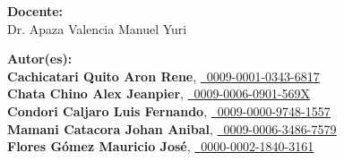 \documentclass[12pt,a4paper]{report}
\begin{document}
\begin{titlepage}
    \vspace{0.5cm}

    \begin{center}
        {\bfseries Docente:}\\[0.1cm]
        Dr. Apaza Valencia Manuel Yuri
    \end{center}

    \vspace{0.5cm}

    \begin{flushleft}
        {\bfseries Autor(es):}\\[0.2cm]
        \small 
        \textbf{Cachicatari Quito Aron Rene}, \href{https://orcid.org/0009-0001-0343-6817}{\textcolor{orcidlogocol}{\faOrcid \ 
        \underline{0009-0001-0343-6817}}} \\ [0.15cm]
        
        \textbf{Chata Chino Alex Jeanpier}, \href{https://orcid.org/0009-0006-0901-569X}
        {\textcolor{orcidlogocol}{\faOrcid \ \underline{0009-0006-0901-569X}}} \\[0.15cm]

        \textbf{Condori Caljaro Luis Fernando}, \href{https://orcid.org/0009-0000-9748-1557}
        {\textcolor{orcidlogocol}{\faOrcid \ \underline{0009-0000-9748-1557}}} \\[0.15cm]

        \textbf{Mamani Catacora Johan Anibal}, \href{https://orcid.org/0009-0006-3486-7579}{\textcolor{orcidlogocol}{\faOrcid \ \underline{0009-0006-3486-7579}}} \\ [0.15cm]
        
        \textbf{Flores Gómez Mauricio José}, \href{https://orcid.org/0000-0002-1840-3161}
        {\textcolor{orcidlogocol}{\faOrcid \ \underline{0000-0002-1840-3161}}} \\[0.15cm]
        
    \end{flushleft}
\end{titlepage}
\end{document}
